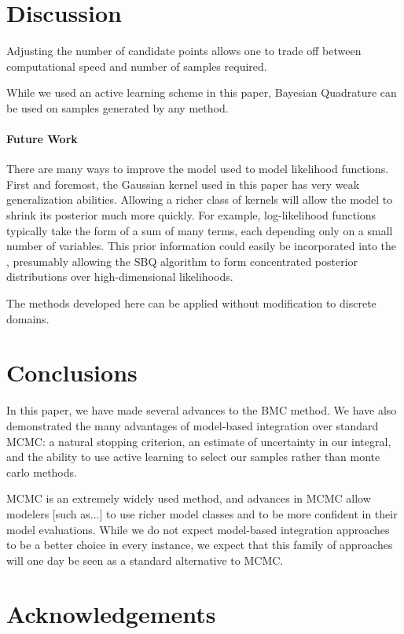 \documentclass{article}
\begin{document}
\section{Discussion}

Adjusting the number of candidate points allows one to trade off between computational speed and number of samples required.

While we used an active learning scheme in this paper, Bayesian Quadrature can be used on samples generated by any method.

\paragraph{Future Work}There are many ways to improve the \gpb model used to model likelihood functions.  First and foremost, the Gaussian kernel used in this paper has very weak generalization abilities.  Allowing a richer class of kernels will allow the \gpb model to shrink its posterior much more quickly.  For example, log-likelihood functions typically take the form of a sum of many terms, each depending only on a small number of variables.  This prior information could easily be incorporated into the \gpb, presumably allowing the SBQ algorithm to form concentrated posterior distributions over high-dimensional likelihoods.

The methods developed here can be applied without modification to discrete domains.

\section{Conclusions}

 In this paper, we have made several advances to the BMC method.  We have also demonstrated the many advantages of model-based integration over standard MCMC: a natural stopping criterion, an estimate of uncertainty in our integral, and the ability to use active learning to select our samples rather than monte carlo methods.

MCMC is an extremely widely used method, and advances in MCMC allow modelers [such as...] to use richer model classes and to be more confident in their model evaluations.  While we do not expect model-based integration approaches to be a better choice in every instance, we expect that this family of approaches will one day be seen as a standard alternative to MCMC.

\section*{Acknowledgements}



\end{document}
